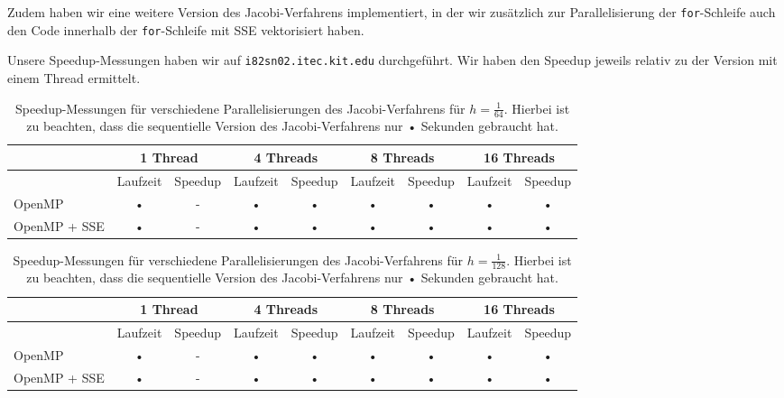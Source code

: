 \documentclass{article}
\begin{document}
Zudem haben wir eine weitere Version des Jacobi-Verfahrens implementiert, in der wir zusätzlich zur Parallelisierung der \texttt{for}-Schleife auch den Code innerhalb der \texttt{for}-Schleife mit SSE vektorisiert haben.

Unsere Speedup-Messungen haben wir auf \texttt{i82sn02.itec.kit.edu} durchgeführt. Wir haben den Speedup jeweils relativ zu der Version mit einem Thread ermittelt.

\begin{table}[h!]
\small
\begin{tabular}{p{1.5cm}|c|c|c|c|c|c|c|c}
 & \multicolumn{2}{c|}{1 Thread} & \multicolumn{2}{c|}{4 Threads} & \multicolumn{2}{c|}{8 Threads} & \multicolumn{2}{|c}{16 Threads} \\ 
\hline 
 & Laufzeit & Speedup & Laufzeit & Speedup & Laufzeit & Speedup & Laufzeit & Speedup \\ 
\hline 
OpenMP & • & - & • & • & • & • & • & • \\ 
\hline
OpenMP + SSE & • & - & • & • & • & • & • & • \\ 
\hline 
\end{tabular}
\caption{Speedup-Messungen für verschiedene Parallelisierungen des Jacobi-Verfahrens für $h=\frac{1}{64}$. Hierbei ist zu beachten, dass die sequentielle Version des Jacobi-Verfahrens nur • Sekunden gebraucht hat.}
\end{table}

\begin{table}[h!]
\small
\begin{tabular}{p{1.5cm}|c|c|c|c|c|c|c|c}
 & \multicolumn{2}{c|}{1 Thread} & \multicolumn{2}{c|}{4 Threads} & \multicolumn{2}{c|}{8 Threads} & \multicolumn{2}{|c}{16 Threads} \\ 
\hline 
 & Laufzeit & Speedup & Laufzeit & Speedup & Laufzeit & Speedup & Laufzeit & Speedup \\ 
\hline 
OpenMP & • & - & • & • & • & • & • & • \\ 
\hline
OpenMP + SSE & • & - & • & • & • & • & • & • \\ 
\hline 
\end{tabular}
\caption{Speedup-Messungen für verschiedene Parallelisierungen des Jacobi-Verfahrens für $h=\frac{1}{128}$. Hierbei ist zu beachten, dass die sequentielle Version des Jacobi-Verfahrens nur • Sekunden gebraucht hat.}
\end{table}
\end{document}
